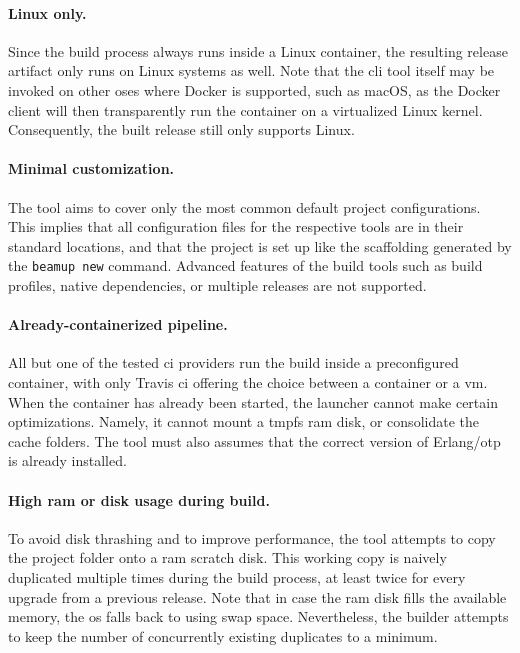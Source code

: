 \paragraph{Linux only.} Since the build process always runs inside a Linux container, the resulting release artifact only runs on Linux systems as well. Note that the \acrshort{cli} tool itself may be invoked on other \acrshort{os}es where Docker is supported, such as macOS, as the Docker client will then transparently run the container on a virtualized Linux kernel.~\cite{docker:docs} Consequently, the built release still only supports Linux.

\paragraph{Minimal customization.} The tool aims to cover only the most common default project configurations. This implies that all configuration files for the respective tools are in their standard locations, and that the project is set up like the scaffolding generated by the \lstinline|beamup new| command. Advanced features of the build tools such as build profiles, native dependencies, or multiple releases are not supported.

\paragraph{Already-containerized pipeline.} All but one of the tested \acrshort{ci} providers run the build inside a preconfigured container, with only Travis \acrshort{ci} offering the choice between a container or a \acrshort{vm}. When the container has already been started, the launcher cannot make certain optimizations. Namely, it cannot mount a \acrshort{tmpfs} \acrshort{ram} disk, or consolidate the cache folders. The tool must also assumes that the correct version of Erlang/\acrshort{otp} is already installed.

\paragraph{High \acrshort{ram} or disk usage during build.}
To avoid disk thrashing and to improve performance, the tool attempts to copy the project folder onto a \acrshort{ram} scratch disk. This working copy is naively duplicated multiple times during the build process, at least twice for every upgrade from a previous release. Note that in case the \acrshort{ram} disk fills the available memory, the \acrshort{os} falls back to using swap space. Nevertheless, the builder attempts to keep the number of concurrently existing duplicates to a minimum.


